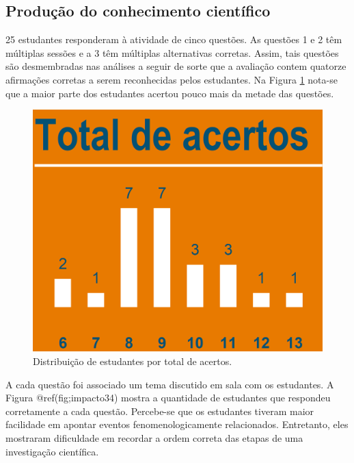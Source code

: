 \documentclass[
]{book}
\begin{document}
\hypertarget{produuxe7uxe3o-do-conhecimento-cientuxedfico}{%
\subsection{Produção do conhecimento científico}\label{produuxe7uxe3o-do-conhecimento-cientuxedfico}}

25 estudantes responderam à atividade de cinco questões. As questões 1 e 2 têm múltiplas sessões e a 3 têm múltiplas alternativas corretas. Assim, tais questões são desmembradas nas análises a seguir de sorte que a avaliação contem quatorze afirmações corretas a serem reconhecidas pelos estudantes. Na Figura \ref{fig:impacto33} nota-se que a maior parte dos estudantes acertou pouco mais da metade das questões.

\begin{figure}

{\centering \includegraphics[width=0.75\linewidth,height=0.75\textheight]{images/Impactos/33} 

}

\caption{Distribuição de estudantes por total de acertos.}\label{fig:impacto33}
\end{figure}

A cada questão foi associado um tema discutido em sala com os estudantes. A Figura @ref(fig;impacto34) mostra a quantidade de estudantes que respondeu corretamente a cada questão. Percebe-se que os estudantes tiveram maior facilidade em apontar eventos fenomenologicamente relacionados. Entretanto, eles mostraram dificuldade em recordar a ordem correta das etapas de uma investigação científica.
\end{document}

